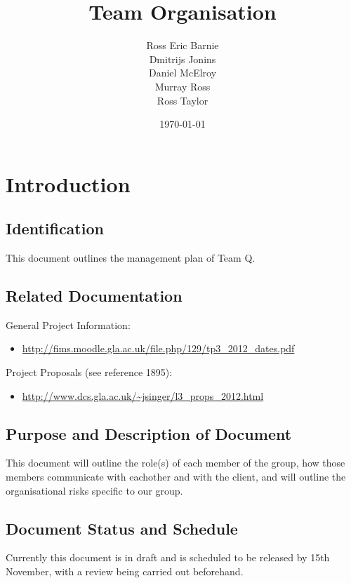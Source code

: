 \documentclass{l3deliverable}
\title{Team Organisation}
\author{
  Ross Eric Barnie \\
  Dmitrijs Jonins \\
  Daniel McElroy \\
  Murray Ross \\
  Ross Taylor
}
\date{\today}
\begin{document}

\maketitle


\section{Introduction}

\subsection{Identification}

This document outlines the management plan of Team Q.

\subsection{Related Documentation}

General Project Information:
\begin{itemize}
\item{\url{http://fims.moodle.gla.ac.uk/file.php/129/tp3_2012_dates.pdf}}
\end{itemize}

Project Proposals (see reference 1895):
\begin{itemize}
\item{\url{http://www.dcs.gla.ac.uk/~jsinger/l3_props_2012.html}}
\end{itemize}

\subsection{Purpose and Description of Document}

This document will outline the role(s) of each member of the group, how those
members communicate with eachother and with the client, and will outline the
organisational risks specific to our group.

\subsection{Document Status and Schedule}

Currently this document is in draft and is scheduled to be released by 15th
November, with a review being carried out beforehand.
\end{document}
